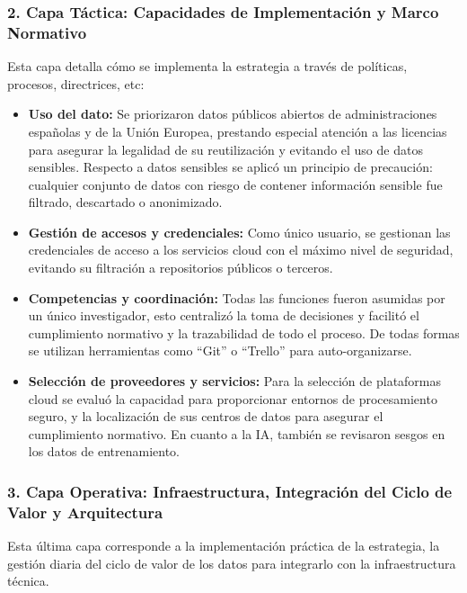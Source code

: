 \subsubsection*{2. Capa Táctica: Capacidades de Implementación y Marco Normativo}

Esta capa detalla cómo se implementa la estrategia a través de políticas, procesos, directrices, etc:

\begin{itemize}
	\item \textbf{Uso del dato:} Se priorizaron datos públicos abiertos de administraciones españolas y de la Unión Europea, prestando especial atención a las licencias para asegurar la legalidad de su reutilización y evitando el uso de datos sensibles. Respecto a datos sensibles se aplicó un principio de precaución: cualquier conjunto de datos con riesgo de contener información sensible fue filtrado, descartado o anonimizado. 
	
	\item \textbf{Gestión de accesos y credenciales:} Como único usuario, se gestionan las credenciales de acceso a los servicios cloud con el máximo nivel de seguridad, evitando su filtración a repositorios públicos o terceros.
	
	\item \textbf{Competencias y coordinación:} Todas las funciones fueron asumidas por un único investigador, esto centralizó la toma de decisiones y facilitó el cumplimiento normativo y la trazabilidad de todo el proceso. De todas formas se utilizan herramientas como ``Git'' o ``Trello'' para auto-organizarse.
	
	\item \textbf{Selección de proveedores y servicios:} Para la selección de plataformas cloud se evaluó la capacidad para proporcionar entornos de procesamiento seguro, y la localización de sus centros de datos para asegurar el cumplimiento normativo. En cuanto a la IA, también se revisaron sesgos en los datos de entrenamiento.
\end{itemize}

\subsubsection*{3. Capa Operativa: Infraestructura, Integración del Ciclo de Valor y Arquitectura}
Esta última capa corresponde a la implementación práctica de la estrategia, la gestión diaria del ciclo de valor de los datos para integrarlo con la infraestructura técnica.

